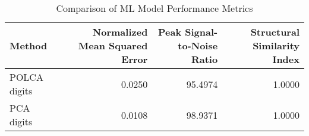 \begin{table}[htbp]
\caption{Comparison of ML Model Performance Metrics}
\label{tab:model_comparison}
\begin{tabular}{lrrr}
\toprule
Method & Normalized Mean Squared Error & Peak Signal-to-Noise Ratio & Structural Similarity Index \\
\midrule
POLCA digits & 0.0250 & 95.4974 & 1.0000 \\
PCA digits & 0.0108 & 98.9371 & 1.0000 \\
\bottomrule
\end{tabular}
\end{table}
